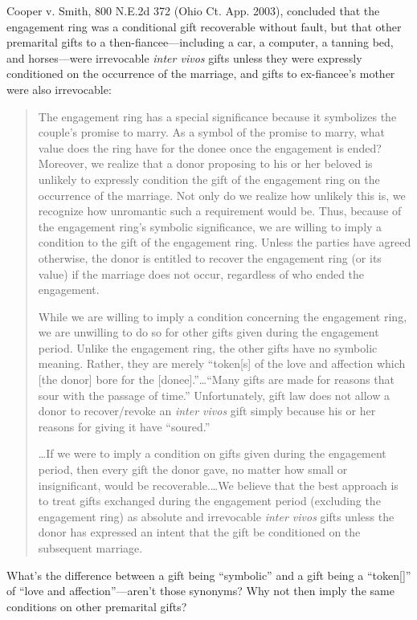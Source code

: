 \item Cooper v. Smith, 800 N.E.2d 372 (Ohio Ct. App. 2003), concluded that the
engagement ring was a conditional gift recoverable without fault, but that
other premarital gifts to a then-fiancee---including a car, a computer, a
tanning bed, and horses---were irrevocable \textit{inter vivos} gifts unless
they were expressly conditioned on the occurrence of the marriage, and gifts to
ex-fiancee's mother were also irrevocable: 
\begin{quotation}
The engagement ring has a special significance because it symbolizes the
couple's promise to marry. As a symbol of the promise to marry, what value does
the ring have for the donee once the engagement is ended? Moreover, we
realize that a donor proposing to his or her beloved is unlikely to expressly
condition the gift of the engagement ring on the occurrence of the marriage.
Not only do we realize how unlikely this is, we recognize how unromantic such a
requirement would be. Thus, because of the engagement ring's symbolic
significance, we are willing to imply a condition to the gift of the engagement
ring. Unless the parties have agreed otherwise, the donor is entitled to
recover the engagement ring (or its value) if the marriage does not occur,
regardless of who ended the engagement.

While we are willing to imply a condition concerning the engagement ring, we are
unwilling to do so for other gifts given during the engagement period. Unlike
the engagement ring, the other gifts have no symbolic meaning. Rather, they are
merely ``token[s] of the love and affection which [the donor] bore for the
[donee].''\dots ``Many gifts are made for reasons that sour with the passage
of time.'' Unfortunately, gift law does not allow a donor to recover/revoke an
\textit{inter vivos} gift simply because his or her reasons for giving it have
``soured.''

\dots If we were to imply a condition on gifts given during the engagement
period, then every gift the donor gave, no matter how small or insignificant,
would be recoverable.\dots We believe that the best approach is to treat
gifts exchanged during the engagement period (excluding the engagement ring) as
absolute and irrevocable \textit{inter vivos} gifts unless the donor has
expressed an intent that the gift be conditioned on the subsequent marriage.
\end{quotation}
What's the difference between a gift being ``symbolic'' and a gift being a
``token[]'' of ``love and affection''---aren't those synonyms?  Why not then
imply the same conditions on other premarital gifts?

